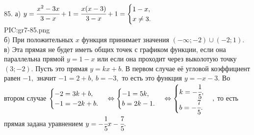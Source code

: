 85. а) $y=\cfrac{x^2-3x}{3-x}+1=\cfrac{x(x-3)}{3-x}+1=\begin{cases} 1-x,\\ x\neq 3.\end{cases}$\\
{{PIC:gr7-85.png}}\\
б) При положительных $x$ функция принимает значения $(-\infty;-2)\cup(-2;1).$\\
в) Эта прямая не будет иметь общих точек с графиком функции, если она параллельна прямой $y=1-x$ или если она проходит через выколотую точку $(3;-2).$ Пусть это прямая $y=kx+b.$ В первом случае её угловой коэффициент равен $-1,$ значит $-1=2+b,\ b=-3,$ то есть это функция $y=-x-3.$ Во втором случае $\begin{cases} -2=3k+b,\\ -1=-2k+b.\end{cases}\Leftrightarrow
\begin{cases} -1=5k,\\ b=2k-1.\end{cases}\Leftrightarrow
\begin{cases} k=-\cfrac{1}{5},\\ b=-\cfrac{7}{5}.\end{cases},$ то есть прямая задана уравнением $y=-\cfrac{1}{5}x-\cfrac{7}{5}.$\\
